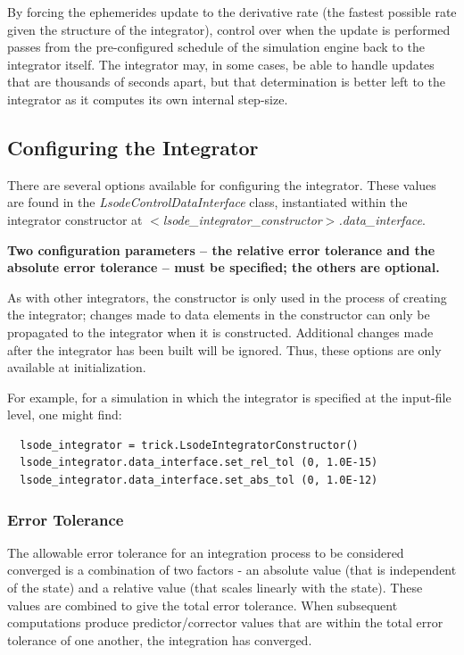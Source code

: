 By forcing the ephemerides update to the derivative rate (the fastest possible
rate given the structure of the integrator), control over when the update is
performed passes from the
pre-configured schedule of the simulation engine back to the integrator
itself.  The integrator may, in some cases, be able to handle updates that are
thousands
of seconds apart, but that determination is
better left to the integrator as it computes its own internal step-size.

\subsection{Configuring the Integrator}

There are several options available for configuring the integrator.  These
values are found in the \textit{LsodeControlDataInterface} class, instantiated
within the integrator constructor at \newline
\textit{$<$lsode\_integrator\_constructor$>$.data\_interface}.

\textbf{Two configuration parameters -- the relative error tolerance and
the absolute error tolerance --
must be specified; the others are optional.}

As with other integrators, the constructor is only used in the process
of creating the integrator; changes made to data elements in the constructor
can only be propagated to the integrator when it is constructed.  Additional
changes made after the integrator has been built will be ignored. Thus,
these options are only available at initialization.

For example, for a simulation in which the integrator is specified at the
input-file level, one might find:

\begin{verbatim}
  lsode_integrator = trick.LsodeIntegratorConstructor()
  lsode_integrator.data_interface.set_rel_tol (0, 1.0E-15)
  lsode_integrator.data_interface.set_abs_tol (0, 1.0E-12)
\end{verbatim}


\subsubsection{Error Tolerance}

The allowable error tolerance for an integration process to be considered
converged is a
combination of two factors - an absolute value (that is independent of the
state) and a relative value (that scales linearly with the state).  These
values are combined to give the total error tolerance.  When
subsequent computations produce predictor/corrector values that are within
the total error tolerance of
one another, the integration has converged.

